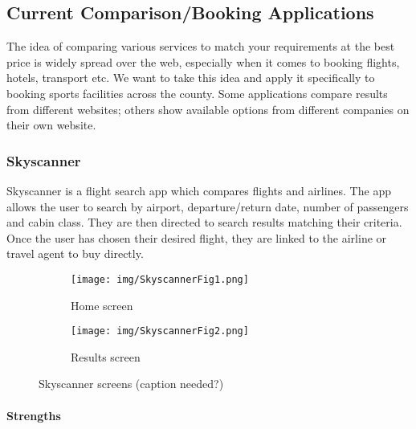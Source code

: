 \subsection{Current Comparison/Booking Applications}
\label{sub:current_comparison_applications}

The idea of comparing various services to match your requirements at the best
price is widely spread over the web, especially when it comes to booking
flights, hotels, transport etc.  We want to take this idea and apply it
specifically to booking sports facilities across the county.  Some applications
compare results from different websites; others show available options from
different companies on their own website.

\subsubsection{Skyscanner}
\label{ssub:skyscanner}

Skyscanner is a flight search app which compares flights and airlines. The app
allows the user to search by airport, departure/return date, number of
passengers and cabin class. They are then directed to search results matching
their criteria. Once the user has chosen their desired flight, they are linked
to the airline or travel agent to buy directly.

\begin{figure}[ht]
    \centering
    \begin{subfigure}[b]{0.2\textwidth}
        \texttt{[image: img/SkyscannerFig1.png]}
        \caption{Home screen}
    \end{subfigure}%
    \qquad
    \begin{subfigure}[b]{0.2\textwidth}
        \texttt{[image: img/SkyscannerFig2.png]}
        \caption{Results screen}
    \end{subfigure}
    \caption{Skyscanner screens (caption needed?)}\label{fig:skyscanner1}
\end{figure}


\paragraph{Strengths}

